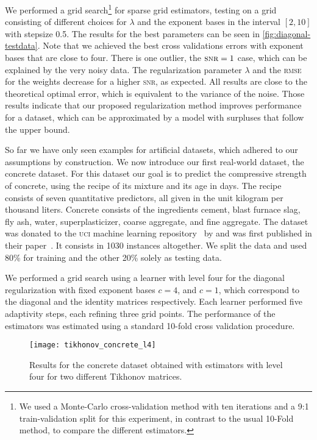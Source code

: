We performed a grid search\footnote{
We used a Monte-Carlo cross-validation method with ten iterations and
a 9:1 train-validation split for this experiment, in contrast to the usual
10-Fold method, to compare the different estimators.
} for sparse grid estimators, testing on a grid
consisting of different choices for \(\lambda\) and the exponent bases in the
interval \([2, 10]\) with stepsize 0.5.
The results for the best parameters can be seen in \cref{fig:diagonal-testdata}.
Note that we achieved the best cross validations errors with exponent bases
that are close to four.
There is one outlier, the \(\textsc{snr} = 1\) case, which can be explained
by the very noisy data.
The regularization parameter \(\lambda\) and the \textsc{rmse} for the weights
decrease for a higher \textsc{snr}, as expected.
All results are close to the theoretical optimal error, which is equivalent to the variance of
the noise.
Those results indicate that our proposed regularization method improves performance for a dataset, which can be approximated by a model with surpluses that follow the upper bound.

So far we have only seen examples for artificial datasets, which adhered to our assumptions by construction.
We now introduce our first real-world dataset, the concrete dataset.
For this dataset our goal is to predict the compressive strength of concrete,
using the recipe of its mixture and its age in days.
The recipe consists of seven quantitative predictors, all given in the unit
kilogram per thousand liters.
Concrete consists of the ingredients cement, blast furnace slag, fly ash,
water, superplasticizer, coarse aggregate, and fine aggregate.
The dataset was donated to the \textsc{uci} machine learning
repository~\cite{datasets-uci} by \citeauthor{datasets-concrete} and was first
published in their paper~\cite{datasets-concrete}.
It consists in 1030 instances altogether.
We split the data and used 80\% for training and the other 20\% solely as
testing data.

We performed a grid search using a learner with level four for the diagonal
regularization with fixed exponent bases \(c = 4\), and \(c = 1\), which
correspond to the diagonal and the identity matrices respectively.
Each learner performed five adaptivity steps, each refining three grid points.
The performance of the estimators was estimated using a standard 10-fold cross validation procedure.

\begin{figure}[htb]
  \centering
  \texttt{[image: tikhonov\_concrete\_l4]}
  \caption{Results for the concrete dataset obtained with estimators with level
    four for two different Tikhonov matrices.}
  \label{fig:tikhonov-concrete-l4}
\end{figure}


